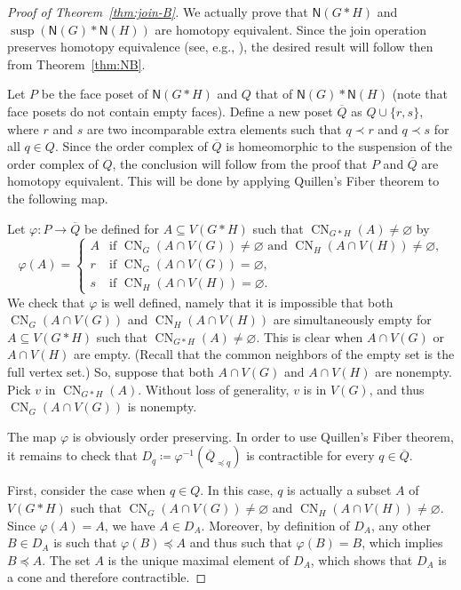 \documentclass[12pt]{amsart}
\theoremstyle{definition}
\def\N{\mathsf{N}}
\renewcommand{\preceq}{\preccurlyeq}
\def\susp{\operatorname{susp}}
\def\CN{\operatorname{CN}}
\begin{document}
\begin{proof}[Proof of Theorem~\ref{thm:join-B}]
We actually prove that $\N(G * H)$ and $\susp( \N(G) * \N(H))$ are homotopy equivalent. Since the join operation preserves homotopy equivalence (see, e.g., \cite[Exercise 2, Section 4.2]{matousek2008using}), the desired result will follow then from Theorem~\ref{thm:NB}.

Let $P$ be the face poset of $\N(G * H)$ and $Q$ that of $\N(G) * \N(H)$ (note that face posets do not contain empty faces). Define a new poset $\overline Q$ as $Q \cup \{r,s\}$, where $r$ and $s$ are two incomparable extra elements such that $q \prec r$ and $q \prec s$ for all $q \in Q$. Since the order complex of $\overline Q$ is homeomorphic to the suspension of the order complex of $Q$, the conclusion will follow from the proof that $P$ and $\overline Q$ are homotopy equivalent. This will be done by applying Quillen's Fiber theorem to the following map.

Let $\varphi\colon P \rightarrow \overline Q$ be defined for $A \subseteq V(G*H)$ such that $\CN_{G*H}(A)\neq\varnothing$ by
\[ \varphi(A) = \begin{cases} 
      A & \text{if $\CN_{G}(A\cap V(G))\neq\varnothing$ and $\CN_{H}(A\cap V(H))\neq\varnothing$,}\\
      r & \text{if $\CN_{G}(A\cap V(G))=\varnothing$,}\\ 
       s & \text{if $\CN_{H}(A\cap V(H))=\varnothing$.}
   \end{cases}
\]
We check that $\varphi$ is well defined, namely that 
it is impossible that both $\CN_{G}(A\cap V(G))$ and $\CN_{H}(A\cap V(H))$ are simultaneously empty for $A \subseteq V(G*H)$ such that $\CN_{G*H}(A)\neq\varnothing$. This is clear when $A\cap V(G)$ or $A\cap V(H)$ are empty. (Recall that the common neighbors of the empty set is the full vertex set.) So, suppose that both $A\cap V(G)$ and $A\cap V(H)$ are nonempty. Pick $v$ in $\CN_{G*H}(A)$. Without loss of generality, $v$ is in $V(G)$, and thus $\CN_G(A\cap V(G))$ is nonempty.

The map $\varphi$ is obviously order preserving. In order to use Quillen's Fiber theorem, it remains to check that $D_q \coloneqq {\varphi}^{-1}(\overline Q_{\preceq q})$ is contractible for every $q \in \overline Q$. 

First, consider the case when $q \in Q$. In this case, $q$ is actually a subset $A$ of $V(G * H)$ such that $\CN_{G}(A\cap V(G))\neq\varnothing$ and $\CN_{H}(A\cap V(H))\neq\varnothing$. Since $\varphi(A)=A$, we have $A \in D_A$. Moreover, by definition of $D_A$, any other $B\in D_A$ is such that $\varphi(B) \preceq A$ and thus such that $\varphi(B) = B$, which implies $B \preceq A$. The set $A$ is the unique maximal element of $D_A$, which shows that $D_A$ is a cone and therefore contractible. 


\end{proof}
\end{document}
